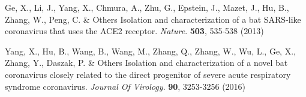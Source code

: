 \documentclass[9pt]{article}
\begin{document}
\begin{thebibliography}{999}
Ge, X., Li, J., Yang, X., Chmura, A., Zhu, G., Epstein, J., Mazet, J., Hu, B., Zhang, W., Peng, C. \& Others Isolation and characterization of a bat SARS-like coronavirus that uses the ACE2 receptor. {\em Nature}. \textbf{503}, 535-538 (2013)

Yang, X., Hu, B., Wang, B., Wang, M., Zhang, Q., Zhang, W., Wu, L., Ge, X., Zhang, Y., Daszak, P. \& Others Isolation and characterization of a novel bat coronavirus closely related to the direct progenitor of severe acute respiratory syndrome coronavirus. {\em Journal Of Virology}. \textbf{90}, 3253-3256 (2016)


\end{thebibliography}



%


\end{document}
